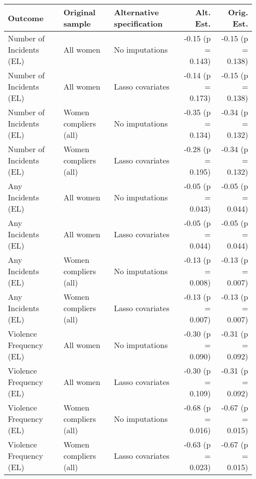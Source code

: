 \begin{tabular}{lllrr}
  \hline
Outcome & Original sample & Alternative specification & Alt. Est. & Orig. Est. \\ 
  \hline
Number of Incidents (EL) & All women & No imputations & -0.15 (p = 0.143) & -0.15 (p = 0.138) \\ 
  Number of Incidents (EL) & All women & Lasso covariates & -0.14 (p = 0.173) & -0.15 (p = 0.138) \\ 
  Number of Incidents (EL) & Women compliers (all) & No imputations & -0.35 (p = 0.134) & -0.34 (p = 0.132) \\ 
  Number of Incidents (EL) & Women compliers (all) & Lasso covariates & -0.28 (p = 0.195) & -0.34 (p = 0.132) \\ 
  Any Incidents (EL) & All women & No imputations & -0.05 (p = 0.043) & -0.05 (p = 0.044) \\ 
  Any Incidents (EL) & All women & Lasso covariates & -0.05 (p = 0.044) & -0.05 (p = 0.044) \\ 
  Any Incidents (EL) & Women compliers (all) & No imputations & -0.13 (p = 0.008) & -0.13 (p = 0.007) \\ 
  Any Incidents (EL) & Women compliers (all) & Lasso covariates & -0.13 (p = 0.007) & -0.13 (p = 0.007) \\ 
  Violence Frequency (EL) & All women & No imputations & -0.30 (p = 0.090) & -0.31 (p = 0.092) \\ 
  Violence Frequency (EL) & All women & Lasso covariates & -0.30 (p = 0.109) & -0.31 (p = 0.092) \\ 
  Violence Frequency (EL) & Women compliers (all) & No imputations & -0.68 (p = 0.016) & -0.67 (p = 0.015) \\ 
  Violence Frequency (EL) & Women compliers (all) & Lasso covariates & -0.63 (p = 0.023) & -0.67 (p = 0.015) \\ 
   \hline
\end{tabular}
